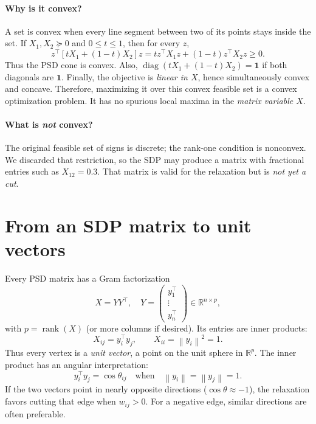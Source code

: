 \documentclass[10pt,letterpaper]{article}
\newcommand{\R}{\mathbb{R}}
\newcommand{\norm}[1]{\left\lVert#1\right\rVert}
\DeclareMathOperator{\diag}{diag}
\DeclareMathOperator{\rank}{rank}
\begin{document}
\paragraph{Why is it convex?} A set is convex when every line segment between two of its points stays inside the set. If $X_1,X_2\succeq0$ and $0\le t\le1$, then for every $z$,
\begin{equation}
 z^\top[tX_1+(1-t)X_2]z
 =t z^\top X_1z+(1-t)z^\top X_2z\ge0.
\end{equation}
Thus the PSD cone is convex. Also, $\diag(tX_1+(1-t)X_2)=\bm1$ if both diagonals are $\bm1$. Finally, the objective is \emph{linear in $X$}, hence simultaneously convex and concave. Therefore, maximizing it over this convex feasible set is a convex optimization problem. It has no spurious local maxima in the \emph{matrix variable $X$}.

\paragraph{What is \emph{not} convex?} The original feasible set of signs is discrete; the rank-one condition is nonconvex. We discarded that restriction, so the SDP may produce a matrix with fractional entries such as $X_{12}=0.3$. That matrix is valid for the relaxation but is \emph{not yet a cut}.

\section{From an SDP matrix to unit vectors}
\label{sec:gram}
Every PSD matrix has a Gram factorization
\begin{equation}\label{eq:gram}
 X=YY^\top,\quad Y=\begin{pmatrix}
 y_1^\top\\\vdots\\y_n^\top
 \end{pmatrix}\in\R^{n\times p},
\end{equation}
with $p=\rank(X)$ (or more columns if desired). Its entries are inner products:
\begin{equation}\label{eq:dot}
 X_{ij}=y_i^\top y_j,
 \qquad X_{ii}=\norm{y_i}^2=1.
\end{equation}
Thus every vertex is a \emph{unit vector}, a point on the unit sphere in $\R^p$. The inner product has an angular interpretation:
\begin{equation}\label{eq:cos}
 y_i^\top y_j=\cos\theta_{ij}
 \quad\text{when}\quad\norm{y_i}=\norm{y_j}=1.
\end{equation}
If the two vectors point in nearly opposite directions ($\cos\theta\approx-1$), the relaxation favors cutting that edge when $w_{ij}>0$. For a negative edge, similar directions are often preferable.
\end{document}

